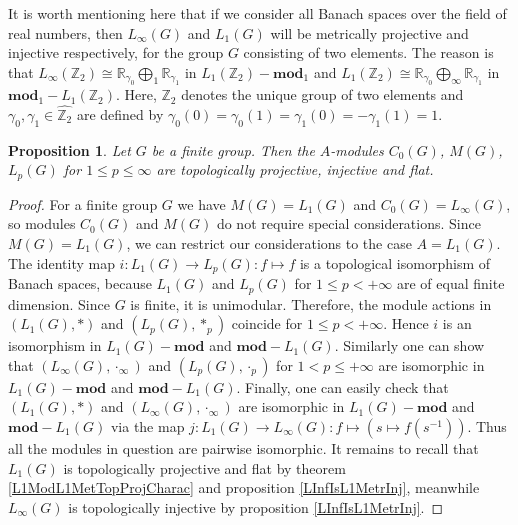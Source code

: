 \documentclass{article}
\theoremstyle{plain}
\newtheorem{proposition}{Proposition}[section]
\theoremstyle{definition}
\newtheorem{proof}{Proof}\def\theproof{}
\newcommand{\convol}{\ast}
\newcommand{\isom}{\mathop{\mathbin{\cong}}}
\begin{document}
\begin{fulltext}
It is worth mentioning here that if we consider all Banach spaces over the field 
of real numbers, then $L_\infty(G)$ and $L_1(G)$ will be metrically projective and injective 
respectively, for the group $G$ consisting of two elements. The reason is that 
$L_\infty(\mathbb{Z}_2)\isom \mathbb{R}_{\gamma_0}\bigoplus\nolimits_1\mathbb{R}_{\gamma_1}$ 
in $L_1(\mathbb{Z}_2)-\mathbf{mod}_1$ and 
$L_1(\mathbb{Z}_2)\isom \mathbb{R}_{\gamma_0}\bigoplus\nolimits_\infty\mathbb{R}_{\gamma_1}$ in 
$\mathbf{mod}_1-L_1(\mathbb{Z}_2)$. Here, $\mathbb{Z}_2$ denotes the unique group of 
two elements and $\gamma_0,\gamma_1\in\widehat{\mathbb{Z}_2}$ are defined by 
$\gamma_0(0)=\gamma_0(1)=\gamma_1(0)=-\gamma_1(1)=1$.

\begin{proposition}\label{StdModFinGrL1MGTopInjProjFlatCharac} Let $G$ be a finite group. 
Then the $A$-modules $C_0(G)$, $M(G)$, $L_p(G)$ for $1\leq p\leq \infty$ are topologically 
projective, injective and flat.
\end{proposition} 
\begin{proof}
For a finite group $G$ we have $M(G)=L_1(G)$ and $C_0(G)=L_\infty(G)$, so modules $C_0(G)$ 
and $M(G)$ do not require special considerations. Since $M(G)=L_1(G)$, we can restrict our 
considerations to the case $A=L_1(G)$. The identity map $i:L_1(G)\to L_p(G):f\mapsto f$ is 
a topological isomorphism of Banach spaces, because $L_1(G)$ and $L_p(G)$ for $1\leq p<+\infty$ 
are of equal finite dimension. Since $G$ is finite, it is unimodular. Therefore, the module 
actions in $(L_1(G),\convol)$ and $(L_p(G),\convol_p)$ coincide for $1\leq p<+\infty$. Hence 
$i$ is an isomorphism in $L_1(G)-\mathbf{mod}$ and $\mathbf{mod}-L_1(G)$. Similarly one can 
show that $(L_\infty(G),\cdot_\infty)$ and $(L_p(G),\cdot_p)$ for $1<p\leq+\infty$ are isomorphic 
in $L_1(G)-\mathbf{mod}$ and $\mathbf{mod}-L_1(G)$. Finally, one can easily check that 
$(L_1(G),\convol)$ and $(L_\infty(G),\cdot_\infty)$ are isomorphic in $L_1(G)-\mathbf{mod}$ and 
$\mathbf{mod}-L_1(G)$ via the map $j:L_1(G)\to L_\infty(G):f\mapsto(s\mapsto f(s^{-1}))$. 
Thus all the modules in question are pairwise isomorphic. It remains to recall that $L_1(G)$ 
is topologically projective and flat by theorem \ref{L1ModL1MetTopProjCharac} and proposition 
\ref{LInfIsL1MetrInj}, meanwhile $L_\infty(G)$ is topologically injective by proposition 
\ref{LInfIsL1MetrInj}.
\end{proof}


\end{fulltext}
\end{document}
